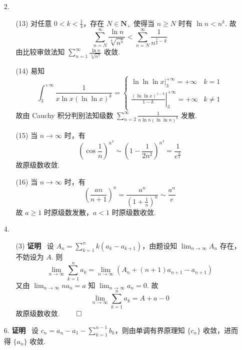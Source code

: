 \documentclass[11pt,oneside,fontset=fandol]{ctexbook} %
\begin{document}
\begin{enumerate}
    \item[2.]
    \begin{enumerate}
        \item[(13)]
        对任意 $0 < k < \frac 1 4$，存在 $N \in \mathbf N_+$ 使得当 $n \geqslant N$ 时有 $\ln n < n^k$. 故
        \[
            \sum_{n=N}^{\infty} \frac{\ln n}{\sqrt[4]{n^5}} < \sum_{n=N}^{\infty} \frac 1 {n^{\frac 5 4 - k}}
        \]
        由比较审敛法知 $\sum_{n=1}^{\infty} \frac{\ln n}{\sqrt[4]{n^5}}$ 收敛.
        \item[(14)]
        易知
        \[
            \int_3^{+\infty} \frac 1 {x \ln x (\ln \ln x)^k} = 
            \begin{cases}
                \ln \ln \ln x \bigg|_3^{+\infty} = +\infty & k = 1 \\
                \left. \frac{(\ln \ln x)^{1-k}}{1-k} \right|_3^{+\infty} = +\infty & k \neq 1
            \end{cases}
        \]
        故由 Cauchy 积分判别法知级数 $\sum_{n=2}^{\infty} \frac 1 {n \ln n (\ln \ln n)^k}$ 发散.
        \item[(15)]
        当 $n \to \infty$ 时，有
        \[
            \left( \cos \frac 1 n \right)^{n^3} \sim \left( 1 - \frac 1 {2n^2} \right)^{n^3} = \frac 1 {e^{\frac n 2}}
        \]
        故原级数收敛.
        \item[(16)]
        当 $n \to \infty$ 时，有
        \[
            \left( \frac{an}{n+1} \right)^n = \frac{a^n}{\left( 1 + \frac 1 n \right)^n} \sim \frac {a^n} e
        \]
        故 $a \geqslant 1$ 时原级数发散，$a < 1$ 时原级数收敛.
    \end{enumerate}
    \item[4.]
    \begin{enumerate}
        \item[(3)]
        \textbf{证明} \ 设 $A_n = \sum_{k=1}^n k (a_k - a_{k+1})$，由题设知 $\lim_{n \to \infty} A_n$ 存在，不妨设为 $A$. 则
        \[
            \lim_{n \to \infty} \sum_{k=1}^n a_k = \lim_{n \to \infty} \left( A_n + (n+1)a_{n+1} - a_{n+1} \right)
        \]
        又由 $\lim_{n \to \infty} n a_n = a$ 知 $\lim_{n \to \infty} a_n = 0$. 故
        \[
            \lim_{n \to \infty} \sum_{k=1}^n a_k = A + a - 0
        \]
        故原级数收敛.
        $\hfill\qed$
    \end{enumerate}
    \item[6.]
    \textbf{证明} \ 设 $c_n = a_n - a_1 - \sum_{k=1}^{n-1} b_k$，则由单调有界原理知 $\{ c_n \}$ 收敛，进而得 $\{ a_n \}$ 收敛.

\end{enumerate}
\end{document}
